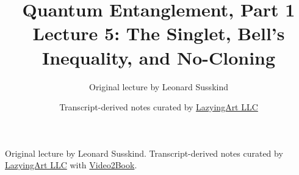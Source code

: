 \documentclass[11pt,oneside]{book}
\begin{document}
\frontmatter
\title{Quantum Entanglement, Part 1\\Lecture 5: The Singlet, Bell's Inequality, and No-Cloning}
\author{Original lecture by Leonard Susskind}
\date{Transcript-derived notes curated by \href{https://lazying.art}{LazyingArt LLC}}
\maketitle
\begin{center}
\small Original lecture by Leonard Susskind. Transcript-derived notes curated by \href{https://lazying.art}{LazyingArt LLC} with \href{https://github.com/lachlanchen/Video2Book}{Video2Book}.
\end{center}
\clearpage
\mainmatter

\end{document}
